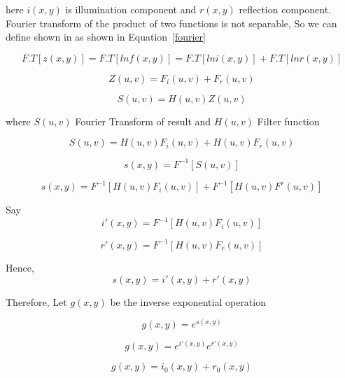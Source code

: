 
here $ i(x,y) $ is  illumination component and  $ r(x,y) $ reflection component.\\



Fourier transform of the product of two functions is not separable, So we can define shown in as shown in Equation~\ref{fourier}

\begin{equation}
F.T[z(x,y)]=F.T[ln f(x,y)]=F.T[ln i(x,y)]+F.T[ln r(x,y)]
\label{fourier}
\end{equation}

\begin{equation}
Z(u,v)=F_{i}(u,v)+F_{r}(u,v)
\end{equation}


 \begin{equation}
  S(u,v)=H(u,v)Z(u,v)
 \end{equation}



 where $S(u,v)$ Fourier Transform of result  and $H(u,v)$ Filter function

      \[S(u,v)=H(u,v)F_{i}(u,v)+H(u,v)F_{r}(u,v)\]

      \[s(x,y)=F^{-1}[S(u,v)]\]

      \[s(x,y)=F^{-1}[H(u,v)F_{i}(u,v)]+F^{-1}[H(u,v)F^{r}(u,v)]\]

      Say
      \[i'(x,y)=F^{-1}[H(u,v)F_{i}(u,v)]\]

       \[r'(x,y)=F^{-1}[H(u,v)F_{r}(u,v)]\]

       Hence,
       \[s(x,y)=i'(x,y)+r'(x,y)\]

       Therefore,
       Let $g(x,y)$ be the inverse exponential operation

       \[g(x,y)=e^{s(x,y)}\]

      \[g(x,y)=e^{i'(x,y)}e^{r'(x,y)}\]

       \[g(x,y)=i_{0}(x,y)+r_{0}(x,y)\]

